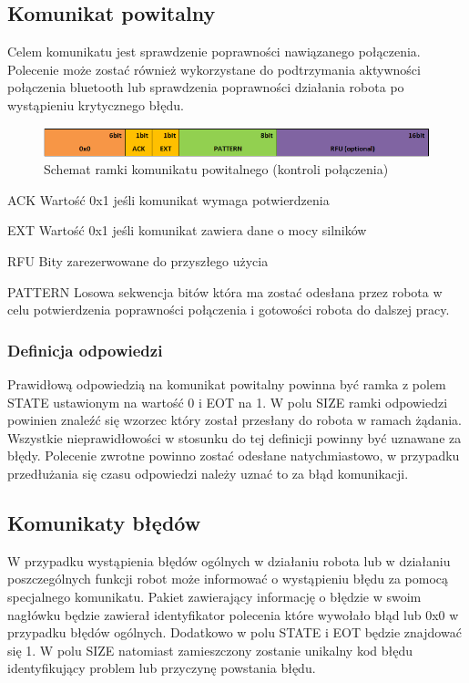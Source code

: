 \subsection{Komunikat powitalny}
Celem komunikatu jest sprawdzenie poprawności nawiązanego połączenia. Polecenie
może zostać również wykorzystane do podtrzymania aktywności połączenia bluetooth
lub sprawdzenia poprawności działania robota po wystąpieniu krytycznego błędu.

\begin{figure}[h!]
 \centering
 \includegraphics[width=\textwidth]{../images/appendix/cmd_0x00.png}
 \caption{Schemat ramki komunikatu powitalnego (kontroli połączenia)} 
 \label{fig:CMD_0x00}
\end{figure}

\begin{basedescript}{\desclabelstyle{\pushlabel}\desclabelwidth{25mm}}
\setlength{\parsep}{0pt}
\setlength{\itemsep}{0mm}
\setlength{\parskip}{0pt}
\item[ACK]
	Wartość 0x1 jeśli komunikat wymaga potwierdzenia
\item[EXT] 
	Wartość 0x1 jeśli komunikat zawiera dane o mocy silników
\item[RFU] 
	Bity zarezerwowane do przyszłego użycia
\item[PATTERN] 
	Losowa sekwencja bitów która ma zostać odesłana przez robota w celu
	potwierdzenia poprawności połączenia i gotowości robota do dalszej pracy.
\end{basedescript}

\subsubsection{Definicja odpowiedzi}
Prawidłową odpowiedzią na komunikat powitalny powinna być ramka z polem STATE
ustawionym na wartość 0 i EOT na 1. W polu SIZE ramki odpowiedzi powinien
znaleźć się wzorzec który został przesłany do robota w ramach żądania.
Wszystkie nieprawidłowości w stosunku do tej definicji powinny być uznawane za
błędy. Polecenie zwrotne powinno zostać odesłane natychmiastowo, w przypadku
przedłużania się czasu odpowiedzi należy uznać to za błąd komunikacji. 

\subsection{Komunikaty błędów}
W przypadku wystąpienia błędów ogólnych w działaniu robota lub w działaniu
poszczególnych funkcji robot może informować o wystąpieniu błędu za pomocą
specjalnego komunikatu. Pakiet zawierający informację o błędzie w swoim nagłówku
będzie zawierał identyfikator polecenia które wywołało błąd lub 0x0 w przypadku
błędów ogólnych. Dodatkowo w polu STATE i EOT będzie znajdować się 1. W polu
SIZE natomiast zamieszczony zostanie unikalny kod błędu identyfikujący
problem lub przyczynę powstania błędu.